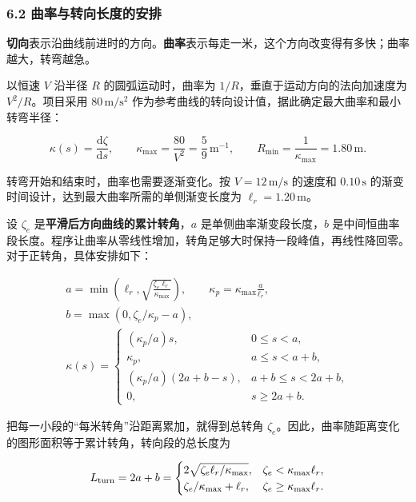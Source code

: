 \documentclass[11pt,a4paper]{article}
\numberwithin{equation}{topic}
\begin{document}
\subsubsection*{6.2 曲率与转向长度的安排}

\textbf{切向}表示沿曲线前进时的方向。\textbf{曲率}表示每走一米，这个方向改变得有多快；曲率越大，转弯越急。

以恒速 \(V\) 沿半径 \(R\) 的圆弧运动时，曲率为 \(1/R\)，垂直于运动方向的法向加速度为 \(V^2/R\)。项目采用 \(80\,\mathrm{m/s^2}\) 作为参考曲线的转向设计值，据此确定最大曲率和最小转弯半径：

\begin{equation}
\label{eq:curvature}
\kappa(s)=\frac{\mathrm d\zeta}{\mathrm ds},\qquad
\kappa_{\max}=\frac{80}{V^2}=\frac59\,\mathrm{m^{-1}},
\qquad
R_{\min}=\frac{1}{\kappa_{\max}}=1.80\,\mathrm m.
\end{equation}

转弯开始和结束时，曲率也需要逐渐变化。按 \(V=12\,\mathrm{m/s}\) 的速度和 \(0.10\,\mathrm s\) 的渐变时间设计，达到最大曲率所需的单侧渐变长度为 \(\ell_r=1.20\,\mathrm m\)。

设 \(\zeta_e\) 是\textbf{平滑后方向曲线的累计转角}，\(a\) 是单侧曲率渐变段长度，\(b\) 是中间恒曲率段长度。程序让曲率从零线性增加，转角足够大时保持一段峰值，再线性降回零。对于正转角，具体安排如下：

\begin{equation}
\label{eq:profile}
\begin{gathered}
a=\min\!\left(\ell_r,\sqrt{\frac{\zeta_e\ell_r}{\kappa_{\max}}}\right),
\qquad
\kappa_p=\kappa_{\max}\frac{a}{\ell_r},
\qquad\\
b=\max(0,\zeta_e/\kappa_p-a),\\[3pt]
\kappa(s)=
\begin{cases}
(\kappa_p/a)s,&0\le s<a,\\
\kappa_p,&a\le s<a+b,\\
(\kappa_p/a)(2a+b-s),&a+b\le s<2a+b,\\
0,&s\ge 2a+b.
\end{cases}
\end{gathered}
\end{equation}

把每一小段的“每米转角”沿距离累加，就得到总转角 \(\zeta_e\)。因此，曲率随距离变化的图形面积等于累计转角，转向段的总长度为

\begin{equation}
\label{eq:turn-length}
L_{\rm turn}=2a+b=
\begin{cases}
2\sqrt{\zeta_e\ell_r/\kappa_{\max}},&
\zeta_e<\kappa_{\max}\ell_r,\\
\zeta_e/\kappa_{\max}+\ell_r,&
\zeta_e\ge\kappa_{\max}\ell_r.
\end{cases}
\end{equation}
\end{document}
